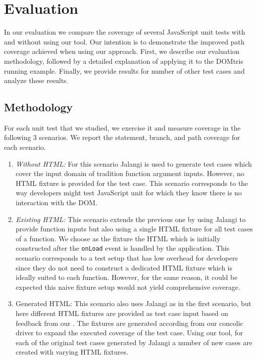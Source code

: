 \section{Evaluation}
In our evaluation we compare the coverage of several JavaScript unit tests  
 with and without using our tool. Our intention is to demonstrate the improved path
coverage achieved when using our approach. First, we describe our evaluation 
methodology, followed by a detailed explanation of applying it to the DOMtris
running example. Finally, we provide results for number of other test cases and
analyze these results.

\subsection{Methodology}
For each unit test that we studied, we exercise it and measure coverage in the following 3 scenarios. We report the statement, branch, and path coverage for each scenario. 

\begin{enumerate}
\item {\em Without HTML: } For this scenario Jalangi is used to generate test cases which cover the input domain of tradition function argument inputs. However,
no HTML fixture is provided for the test case. This scenario corresponds to the
way developers might test JavaScript unit for which they know there is no
interaction with the DOM.
\item {\em Existing HTML: } This scenario extends the previous one by using Jalangi to provide function inputs but also using a single HTML fixture for all test cases of a function. We choose as the fixture the HTML which is initially constructed after the {\tt onLoad} event is handled by the application. This scenario
corresponds to a test setup that has low overhead for developers since they 
do not need to construct a dedicated HTML fixture which is ideally suited to each function. However, for the same reason, it could be expected this naive fixture setup would not yield comprehensive coverage.  
\item {\tool Generated HTML: } This scenario also uses Jalangi as in the first scenario, but here different HTML fixtures are provided as test case input based
on feedback from our \tool. The fixtures are generated according from our concolic driver to expand the executed coverage of the test case. Using our tool, for each of the original test cases generated by Jalangi a number of new cases are created with varying HTML fixtures. 
\end{enumerate}

